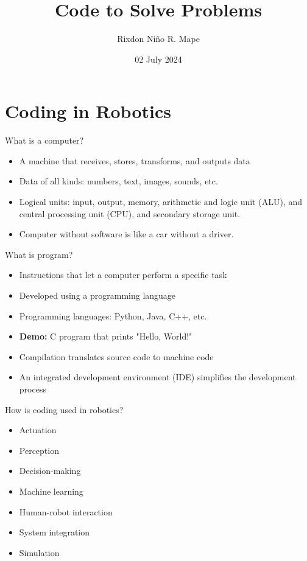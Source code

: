 \documentclass[sectionframe]{oxblue-beamer}
\title{Code to Solve Problems}
\author[Mape, R. N. R.]{Rixdon Niño R. Mape}
\institute{
    College of Science \\
    Computer Science and Information Technology Department \\
    Bicol University
}
\date{02 July 2024}
\begin{document}
\begin{frame}
\titlepage
\end{frame}

\section{Coding in Robotics}

\begin{frame}{What is a computer?}
\begin{itemize}
    \item A machine that receives, stores, transforms, and outputs data
    \item Data of all kinds: numbers, text, images, sounds, etc.
    \item Logical units: input, output, memory, arithmetic and logic unit (ALU), and central processing unit (CPU), and secondary storage unit.
    \item Computer without software is like a car without a driver.
\end{itemize}
\end{frame}

\begin{frame}{What is program?}
\begin{itemize}
    \item Instructions that let a computer perform a specific task
    \item Developed using a programming language
    \item Programming languages: Python, Java, C++, etc.
    \item \textbf{Demo:} C program that prints "Hello, World!"
    \item Compilation translates source code to machine code
    \item An integrated development environment (IDE) simplifies the development process
\end{itemize}
\end{frame}

\begin{frame}{How is coding used in robotics?}
\begin{itemize}
    \item Actuation
    \item Perception
    \item Decision-making
    \item Machine learning
    \item Human-robot interaction
    \item System integration
    \item Simulation
\end{itemize}
\end{frame}
\end{document}
